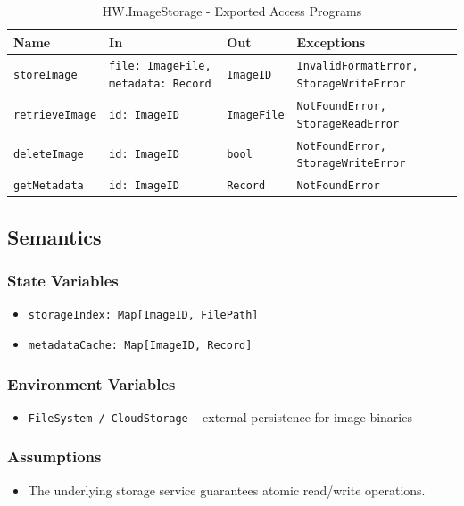 \documentclass[12pt, titlepage]{article}
\begin{document}
\begin{table}[H]
\centering
\small
\caption{HW.ImageStorage - Exported Access Programs}
\begin{tabular}{p{3cm} p{3.5cm} p{3cm} p{4.5cm}}
\toprule
\textbf{Name} & \textbf{In} & \textbf{Out} & \textbf{Exceptions} \\
\midrule
\texttt{storeImage} & \texttt{file: ImageFile, metadata: Record} & \texttt{ImageID} & \texttt{InvalidFormatError, StorageWriteError} \\
\texttt{retrieveImage} & \texttt{id: ImageID} & \texttt{ImageFile} & \texttt{NotFoundError, StorageReadError} \\
\texttt{deleteImage} & \texttt{id: ImageID} & \texttt{bool} & \texttt{NotFoundError, StorageWriteError} \\
\texttt{getMetadata} & \texttt{id: ImageID} & \texttt{Record} & \texttt{NotFoundError} \\
\bottomrule
\end{tabular}
\end{table}

\subsection{Semantics}

\subsubsection{State Variables}
\begin{itemize}
    \item \texttt{storageIndex: Map[ImageID, FilePath]}
    \item \texttt{metadataCache: Map[ImageID, Record]}
\end{itemize}

\subsubsection{Environment Variables}
\begin{itemize}
    \item \texttt{FileSystem / CloudStorage} – external persistence for image binaries
\end{itemize}

\subsubsection{Assumptions}
\begin{itemize}
    \item The underlying storage service guarantees atomic read/write operations.
\end{itemize}
\end{document}
